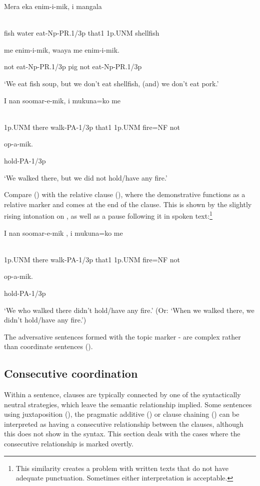 \ea%
\label{ex:x1389}
\gll Mera  eka  enim-i-mik,    i  mangala \\
      \\
\glt
\z

fish  water  eat-Np-PR.1/3p  that1  1p.UNM  shellfish

me  enim-i-mik,  waaya  me  enim-i-mik.

not  eat-Np-PR.1/3p  pig  not  eat-Np-PR.1/3p

`We eat fish soup, but we don't eat shellfish, (and) we don't eat pork.'

\ea%
\label{ex:x1394}
\gll I  nan  soomar-e-mik,    i  mukuna=ko  me \\
      \\
\glt
\z

1p.UNM  there  walk-PA-1/3p  that1  1p.UNM  fire=NF  not

op-a-mik.

hold-PA-1/3p

`We walked there, but we did not hold/have any fire.'

Compare () with the relative clause (), where the demonstrative functions as a relative marker and comes at the end of the clause. This is shown by the slightly rising intonation on , as well as a pause following it in spoken text:\footnote{This similarity creates a problem with written texts that do not have adequate punctuation. Sometimes either interpretation is acceptable.} 

\ea%
\label{ex:x1396}
\gll I  nan  soomar-e-mik  ,  i  mukuna=ko  me  \\
      \\
\glt
\z

1p.UNM  there  walk-PA-1/3p  that1  1p.UNM  fire=NF  not

op-a-mik.

hold-PA-1/3p

`We who walked there didn't hold/have any fire.' (Or: `When we walked there, we didn't hold/have any fire.')

The adversative sentences formed with the topic marker - are complex rather than coordinate sentences ().

\subsection{Consecutive coordination}
\hypertarget{RefHeading23041935131865}{}
Within a sentence, clauses are typically connected by one of the syntactically neutral strategies, which leave the semantic relationship implied. Some sentences using juxtaposition (), the pragmatic additive  () or clause chaining () can be interpreted as having a consecutive relationship between the clauses, although this does not show in the syntax. This section deals with the cases where the consecutive relationship is marked overtly.

